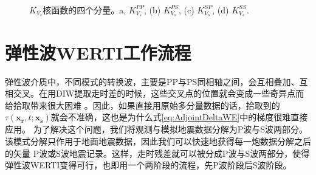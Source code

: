 \begin{figure}
   \centering
   \\
   \caption{$K_{V_s}$核函数的四个分量。a, $K_{V_s}^{PP}$, (b) $K_{V_s}^{PS}$, (c) $K_{V_s}^{SP}$, (d) $K_{V_s}^{SS}$.}
   \label{fig:kernel2_vs_decomp}
\end{figure}
\section{弹性波WERTI工作流程}
弹性波介质中，不同模式的转换波，主要是PP与PS同相轴之间，会互相叠加、互相交叉。在用DIW提取走时差的时候，这些交叉点的位置就会变成一些奇异点而给拾取带来很大困难
。因此，如果直接用原始多分量数据的话，拾取到的$\tau(\mathbf{x_r},t;\mathbf{x_s})$就会不准确，这也是为什么式\eqref{eq:AdjointDeltaWE}中的梯度很难直接应用。
为了解决这个问题，我们将观测与模拟地震数据分解为P波与S波两部分。该模式分解只作用于地面地震数据\cite[]{Li2016a}，因此我们可以快速地获得每一炮数据分解之后的矢量
P波或S波地震记录。这样，走时残差就可以被分成P波与S波两部分，使得弹性波WERTI变得可行，也即用一个两阶段的流程，先P波阶段后S波阶段。

